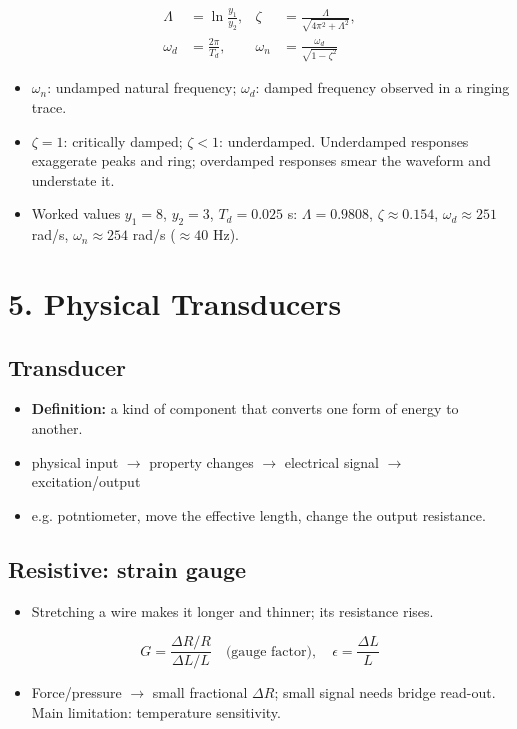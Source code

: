 \documentclass[10pt,a4paper]{ctexart}
\newcommand{\key}[1]{\textbf{#1}}
\newcommand{\formula}[1]{%
  \par\vspace{1pt}%
  \begingroup
  \setlength{\abovedisplayskip}{0pt}%
  \setlength{\belowdisplayskip}{0pt}%
  \[
    #1
  \]
  \endgroup
  \vspace{1pt}%
}
\begin{document}
\begin{multicols*}{3}
\formula{\displaystyle
  \begin{aligned}
    \Lambda&=\ln\frac{y_1}{y_2},&
    \zeta&=\frac{\Lambda}{\sqrt{4\pi^2+\Lambda^2}},\\
    \omega_d&=\frac{2\pi}{T_d},&
    \omega_n&=\frac{\omega_d}{\sqrt{1-\zeta^2}}
  \end{aligned}}

\begin{itemize}
  \item $\omega_n$: undamped natural frequency; $\omega_d$: damped frequency
  observed in a ringing trace.
  \item $\zeta=1$: critically damped; $\zeta<1$: underdamped.
  Underdamped responses exaggerate peaks and ring; overdamped responses smear
  the waveform and understate it.
  \item Worked values $y_1=8$, $y_2=3$, $T_d=0.025$ s:
  $\Lambda=0.9808$, $\zeta\approx0.154$, $\omega_d\approx251$ rad/s,
  $\omega_n\approx254$ rad/s ($\approx40$ Hz).
\end{itemize}


\section{5. Physical Transducers}
\subsection{Transducer}
\begin{itemize}
    \item \key{Definition:} a kind of component that converts one form of energy to another.
    \item physical input $\rightarrow$ property changes $\rightarrow$ electrical signal $\rightarrow$ excitation/output
    \item e.g. potntiometer, move the effective length, change the output resistance.
\end{itemize}

\subsection{Resistive: strain gauge}
\begin{itemize}
  \item Stretching a wire makes it longer and thinner; its resistance rises.
\end{itemize}
\formula{\displaystyle
  G=\frac{\Delta R/R}{\Delta L/L}
  \quad\text{(gauge factor)},\quad
  \epsilon=\frac{\Delta L}{L}}
\begin{itemize}
  \item Force/pressure $\rightarrow$ small fractional $\Delta R$; small signal
  needs bridge read-out. Main limitation: temperature sensitivity.
\end{itemize}


\end{multicols*}
\end{document}
